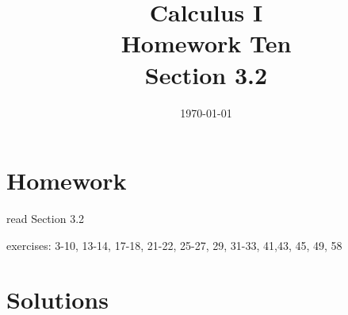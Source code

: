 \documentclass[letterpaper]{exam}
\title{Calculus I \\ Homework Ten \\ Section 3.2}
\author{}
\date{\today}
\begin{document}
  \maketitle

  \section{Homework}
    \begin{itemize*}
      \item read Section 3.2
      \item exercises: 3-10, 13-14, 17-18, 21-22, 25-27, 29, 31-33, 41,43, 45, 49, 58
    \end{itemize*}

  \ifprintanswers

  \section{Solutions}
\end{document}
